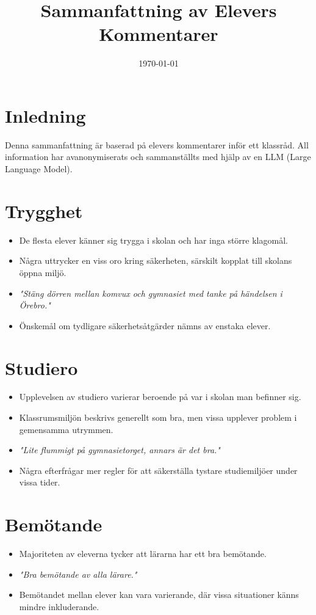 \documentclass[a4paper,12pt]{article}
\title{Sammanfattning av Elevers Kommentarer}
\author{}
\date{\today}
\begin{document}
\maketitle

\section*{Inledning}
Denna sammanfattning är baserad på elevers kommentarer inför ett klassråd. All information har avanonymiserats och sammanställts med hjälp av en LLM (Large Language Model).

\section*{Trygghet}
\begin{itemize}
    \item De flesta elever känner sig trygga i skolan och har inga större klagomål.
    \item Några uttrycker en viss oro kring säkerheten, särskilt kopplat till skolans öppna miljö.
    \item \textit{"Stäng dörren mellan komvux och gymnasiet med tanke på händelsen i Örebro."}
    \item Önskemål om tydligare säkerhetsåtgärder nämns av enstaka elever.
\end{itemize}

\section*{Studiero}
\begin{itemize}
    \item Upplevelsen av studiero varierar beroende på var i skolan man befinner sig.
    \item Klassrumsmiljön beskrivs generellt som bra, men vissa upplever problem i gemensamma utrymmen.
    \item \textit{"Lite flummigt på gymnasietorget, annars är det bra."}
    \item Några efterfrågar mer regler för att säkerställa tystare studiemiljöer under vissa tider.
\end{itemize}

\section*{Bemötande}
\begin{itemize}
    \item Majoriteten av eleverna tycker att lärarna har ett bra bemötande.
    \item \textit{"Bra bemötande av alla lärare."}
    \item Bemötandet mellan elever kan vara varierande, där vissa situationer känns mindre inkluderande.
\end{itemize}
\end{document}
